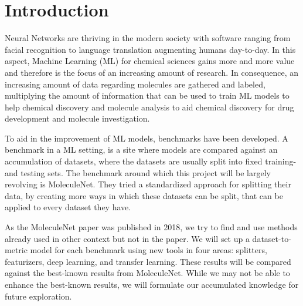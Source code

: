 \section{Introduction}
Neural Networks are thriving in the modern society with software ranging from facial recognition to
language translation augmenting humans day-to-day. In this aspect, Machine Learning (ML) for chemical
sciences gains more and more value and therefore is the focus of an increasing amount of research. In
consequence, an increasing amount of data regarding molecules are gathered and labeled, multiplying
the amount of information that can be used to train ML models to help chemical discovery and molecule
analysis to aid chemical discovery for drug development and molecule investigation.

To aid in the improvement of ML models, benchmarks have been developed. A benchmark in a ML
setting, is a site where models are compared against an accumulation of datasets, where the datasets are
usually split into fixed training- and testing sets. The benchmark around which this project will be largely
revolving is MoleculeNet. They tried a standardized approach for splitting their data, by creating more
ways in which these datasets can be split, that can be applied to every dataset they have.

As the MoleculeNet paper was published in 2018, we try to find and use methods already used in other
context but not in the paper. We will set up a dataset-to-metric model for each benchmark using new tools
in four areas: splitters, featurizers, deep learning, and transfer learning. These results will be compared
against the best-known results from MoleculeNet. While we may not be able to enhance the best-known
results, we will formulate our accumulated knowledge for future exploration.